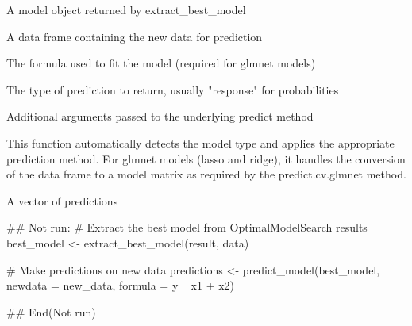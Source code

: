 \documentclass[a4paper]{book}
\begin{document}
%
\begin{Arguments}
\begin{ldescription}
\item[\code{model}] A model object returned by extract\_best\_model

\item[\code{newdata}] A data frame containing the new data for prediction

\item[\code{formula}] The formula used to fit the model (required for glmnet models)

\item[\code{type}] The type of prediction to return, usually "response" for probabilities

\item[\code{...}] Additional arguments passed to the underlying predict method
\end{ldescription}
\end{Arguments}
%
\begin{Details}
This function automatically detects the model type and applies the appropriate
prediction method. For glmnet models (lasso and ridge), it handles the conversion
of the data frame to a model matrix as required by the predict.cv.glmnet method.
\end{Details}
%
\begin{Value}
A vector of predictions
\end{Value}
%
\begin{Examples}
\begin{ExampleCode}
## Not run: 
# Extract the best model from OptimalModelSearch results
best_model <- extract_best_model(result, data)

# Make predictions on new data
predictions <- predict_model(best_model, newdata = new_data, 
                            formula = y ~ x1 + x2)

## End(Not run)
\end{ExampleCode}
\end{Examples}
\printindex{}
\end{document}
